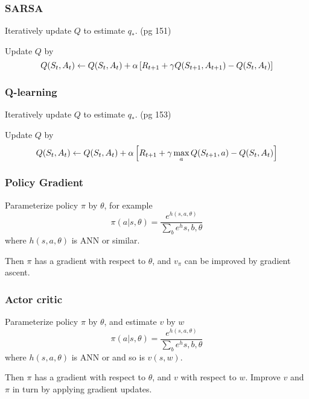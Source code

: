 \documentclass{beamer}
\begin{document}
\frame
{
   \frametitle{SARSA}
   Iteratively update $Q$ to estimate $q_*$. (pg 151)   
   
   Update $Q$ by
   $$Q(S_t,A_t) \leftarrow Q(S_t, A_t) + \alpha \left[{R_{t+1} + \gamma Q(S_{t+1}, A_{t+1}) - Q(S_t,A_t)}\right]$$
}

\frame
{
   \frametitle{Q-learning}
   Iteratively update $Q$ to estimate $q_*$. (pg 153)   
   
   Update $Q$ by
   $$Q(S_t,A_t) \leftarrow Q(S_t, A_t) + \alpha \left[{R_{t+1} + \gamma \max_a Q(S_{t+1}, a) - Q(S_t,A_t)}\right]$$
}

\frame
{
   \frametitle{Policy Gradient}
   Parameterize policy $\pi$ by $\theta$, for example
   $$\pi(a|s, \theta) = \frac{e^{h(s, a, \theta)}}{\sum_b e^h{s, b, \theta}}$$
   where $h(s, a, \theta)$ is ANN or similar.

   Then $\pi$ has a gradient with respect to $\theta$, and $v_\pi$ can be 
   improved by gradient ascent.
}

\frame
{
   \frametitle{Actor critic}
   Parameterize policy $\pi$ by $\theta$, and estimate $v$ by $w$
   $$\pi(a|s, \theta) = \frac{e^{h(s, a, \theta)}}{\sum_b e^h{s, b, \theta}}$$
   where $h(s, a, \theta)$ is ANN or and so is $v(s, w)$.

   Then $\pi$ has a gradient with respect to $\theta$, and $v$ with respect to
   $w$. Improve $v$ and $\pi$ in turn by applying gradient updates.
}
\end{document}
